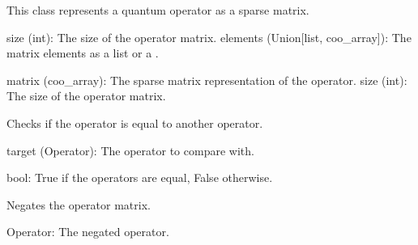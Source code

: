 \documentclass[letterpaper,10pt,english]{sphinxmanual}
\begin{document}
\begin{fulllineitems}
\label{\detokenize{index:utils.tensor.Operator}}
\pysigstartsignatures
{}
\pysigstopsignatures
\sphinxAtStartPar
This class represents a quantum operator as a sparse matrix.
\begin{description}
\sphinxAtStartPar
size (int): The size of the operator matrix.
elements (Union{[}list, coo\_array{]}): The matrix elements as a list or a .

\sphinxAtStartPar
matrix (coo\_array): The sparse matrix representation of the operator.
size (int): The size of the operator matrix.

\end{description}

\begin{fulllineitems}
\label{\detokenize{index:utils.tensor.Operator.equal}}
\pysigstartsignatures
{}
\pysigstopsignatures
\sphinxAtStartPar
Checks if the operator is equal to another operator.
\begin{description}
\sphinxAtStartPar
target (Operator): The operator to compare with.

\sphinxAtStartPar
bool: True if the operators are equal, False otherwise.

\end{description}

\end{fulllineitems}


\begin{fulllineitems}
\label{\detokenize{index:utils.tensor.Operator.negate}}
\pysigstartsignatures
{}
\pysigstopsignatures
\sphinxAtStartPar
Negates the operator matrix.
\begin{description}
\sphinxAtStartPar
Operator: The negated operator.


\end{description}
\end{fulllineitems}
\end{fulllineitems}
\end{document}
